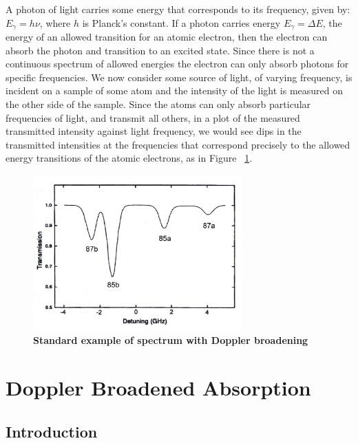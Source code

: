 \documentclass[paper=a4, fontsize=11pt]{scrartcl} %
\numberwithin{equation}{section}
\numberwithin{figure}{section}
\numberwithin{table}{section}
\begin{document}
A photon of light carries some energy that corresponds to its
frequency, given by: $E_\gamma = h\nu$, where $h$ is Planck's
constant. If a photon carries energy $E_\gamma = \Delta E$, the energy
of an allowed transition for an atomic electron, then the electron can
absorb the photon and transition to an excited state. Since there is
not a continuous spectrum of allowed energies the electron can only
absorb photons for specific frequencies. We now consider some source
of light, of varying frequency, is incident on a sample of some atom
and the intensity of the light is measured on the other side of the
sample. Since the atoms can only absorb particular frequencies of
light, and transmit all others, in a plot of the measured transmitted
intensity against light frequency, we would see dips in the
transmitted intensities at the frequencies that correspond precisely
to the allowed energy transitions of the atomic electrons, as in
Figure ~\ref{fig:broadening}. 

\begin{figure}[h] \begin{center}
  \includegraphics[height=60mm]{broadening.png}
  \caption{\textbf{Standard example of spectrum with Doppler broadening}}
  \label{fig:broadening}
\end{center} \end{figure}


\section{Doppler Broadened Absorption}
\label{sec:broad}

\subsection{Introduction}
\end{document}
